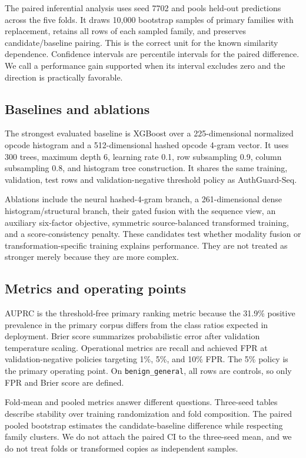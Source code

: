 \documentclass[conference]{IEEEtran}
\newcommand{\model}{AuthGuard-Seq}
\newcommand{\bgen}{\texttt{benign\_general}}
\begin{document}
The paired inferential analysis uses seed 7702 and pools held-out predictions across the five
folds. It draws 10,000 bootstrap samples of primary families with replacement, retains all rows
of each sampled family, and preserves candidate/baseline pairing. This is the correct unit for the
known similarity dependence. Confidence intervals are percentile intervals for the paired
difference. We call a performance gain supported when its interval excludes zero and the direction
is practically favorable.

\subsection{Baselines and ablations}

The strongest evaluated baseline is XGBoost over a 225-dimensional normalized opcode histogram
and a 512-dimensional hashed opcode 4-gram vector. It uses 300 trees, maximum depth 6, learning
rate 0.1, row subsampling 0.9, column subsampling 0.8, and histogram tree construction. It shares
the same training, validation, test rows and validation-negative threshold policy as \model.

Ablations include the neural hashed-4-gram branch, a 261-dimensional dense histogram/structural
branch, their gated fusion with the sequence view, an auxiliary six-factor objective, symmetric
source-balanced transformed training, and a score-consistency penalty. These candidates test
whether modality fusion or transformation-specific training explains performance. They are not
treated as stronger merely because they are more complex.

\subsection{Metrics and operating points}

AUPRC is the threshold-free primary ranking metric because the 31.9\% positive prevalence in the
primary corpus differs from the class ratios expected in deployment. Brier score summarizes
probabilistic error after validation temperature scaling. Operational metrics are recall and
achieved FPR at validation-negative policies targeting 1\%, 5\%, and 10\% FPR. The 5\% policy is
the primary operating point. On \bgen, all rows are controls, so only FPR and Brier score are
defined.

Fold-mean and pooled metrics answer different questions. Three-seed tables describe stability
over training randomization and fold composition. The paired pooled bootstrap estimates the
candidate-baseline difference while respecting family clusters. We do not attach the paired CI
to the three-seed mean, and we do not treat folds or transformed copies as independent samples.
\end{document}
